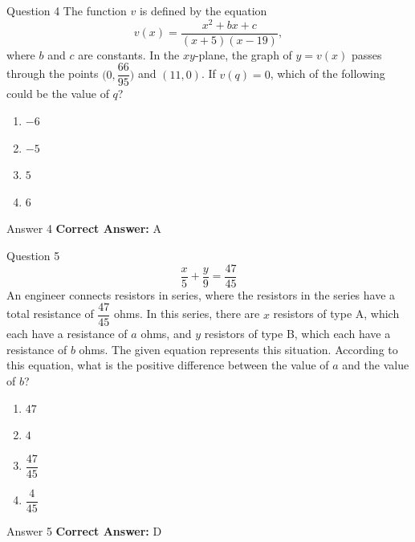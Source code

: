 \documentclass{beamer}
\begin{document}
\begin{frame}{Question 4}
\small
The function \(v\) is defined by the equation
\[
v(x) = \dfrac{x^{2} + bx + c}{(x + 5)(x - 19)},
\]
where \(b\) and \(c\) are constants. In the \(xy\)-plane, the graph of \(y = v(x)\) passes through the points \(\bigl(0, \dfrac{66}{95}\bigr)\) and \((11, 0)\). If \(v(q) = 0\), which of the following could be the value of \(q\)?
\vspace{0.35cm}
\begin{enumerate}
    \item[A.] \(-6\)
    \item[B.] \(-5\)
    \item[C.] \(5\)
    \item[D.] \(6\)
\end{enumerate}
\end{frame}
\begin{frame}{Answer 4}
\small
\textbf{Correct Answer:} A
\end{frame}

\begin{frame}{Question 5}
\small
\[
\dfrac{x}{5} + \dfrac{y}{9} = \dfrac{47}{45}
\]
An engineer connects resistors in series, where the resistors in the series have a total resistance of \(\dfrac{47}{45}\) ohms. In this series, there are \(x\) resistors of type A, which each have a resistance of \(a\) ohms, and \(y\) resistors of type B, which each have a resistance of \(b\) ohms. The given equation represents this situation. According to this equation, what is the positive difference between the value of \(a\) and the value of \(b\)?
\vspace{0.35cm}
\begin{enumerate}
    \item[A.] \(47\)
    \item[B.] \(4\)
    \item[C.] \(\dfrac{47}{45}\)
    \item[D.] \(\dfrac{4}{45}\)
\end{enumerate}
\end{frame}
\begin{frame}{Answer 5}
\small
\textbf{Correct Answer:} D
\end{frame}
\end{document}
